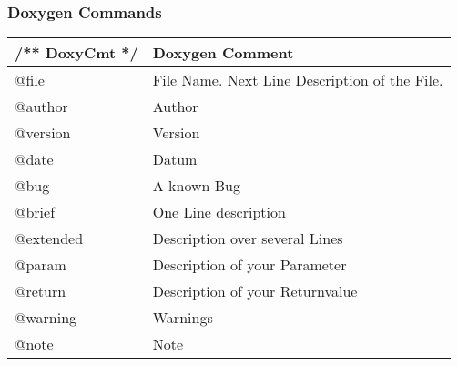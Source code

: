 \subsubsection{Doxygen Commands}
\renewcommand{\arraystretch}{1.5}
\begin{tabular}{|l|l|}
	\hline	/** DoxyCmt */ &  Doxygen Comment\\ 
	\hline	@file		& File Name. Next Line Description of the File.\\
	\hline	@author 	& Author\\
	\hline	@version	& Version \\
	\hline   @date		& Datum   \\ 
	\hline   @bug		& A known Bug \\
	\hline   @brief		& One Line description  \\
	\hline   @extended	& Description over several Lines  \\
	\hline   @param		& Description of your Parameter  \\
	\hline   @return		& Description of your Returnvalue     \\ 
	\hline   @warning	& Warnings \\ 
	\hline   @note		& Note\\ 
	\hline        
\end{tabular}

